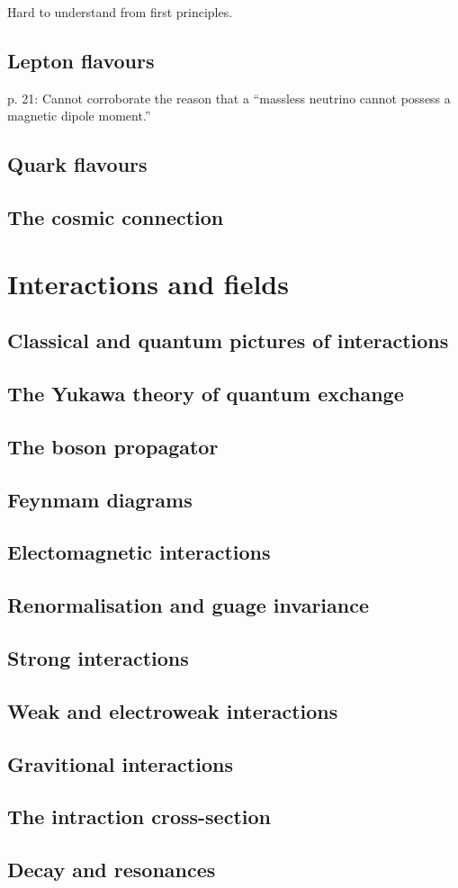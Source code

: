 \documentclass{book}
\begin{document}
Hard to understand from first principles.

\section{Lepton flavours}

p. 21: Cannot corroborate the reason that a ``massless neutrino cannot possess a magnetic dipole moment.''

\section{Quark flavours}
\section{The cosmic connection}

\chapter{Interactions and fields}
\section{Classical and quantum pictures of interactions}
\section{The Yukawa theory of quantum exchange}
\section{The boson propagator}
\section{Feynmam diagrams}
\section{Electomagnetic interactions}
\section{Renormalisation and guage invariance}
\section{Strong interactions}
\section{Weak and electroweak interactions}
\section{Gravitional interactions}
\section{The intraction cross-section}
\section{Decay and resonances}
\end{document}
